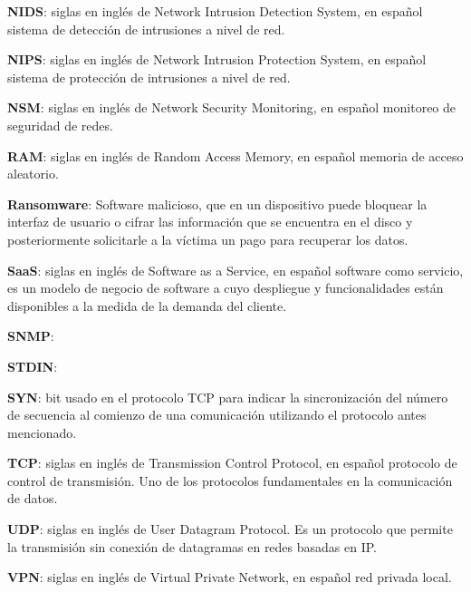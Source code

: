 \textbf{NIDS}: siglas en inglés de Network Intrusion Detection System, en español sistema de detección de intrusiones a nivel de red. \par

\textbf{NIPS}: siglas en inglés de Network Intrusion Protection System, en español sistema de protección de intrusiones a nivel de red. \par

\textbf{NSM}: siglas en inglés de Network Security Monitoring, en español monitoreo de seguridad de redes. \par

\textbf{RAM}: siglas en inglés de Random Access Memory, en español memoria de acceso aleatorio. \par

\textbf{Ransomware}: Software malicioso, que en un dispositivo puede bloquear la interfaz de usuario o cifrar las información que se encuentra en el disco y posteriormente solicitarle a la víctima un pago para recuperar los datos. \par
\textbf{SaaS}: siglas en inglés de Software as a Service, en español software como servicio, es un modelo de negocio de software a cuyo despliegue y funcionalidades están disponibles a la medida de la demanda del cliente. \par

\textbf{SNMP}:  \par

\textbf{STDIN}: \par

\textbf{SYN}: bit usado en el protocolo TCP para indicar la sincronización del número de secuencia al comienzo de una comunicación utilizando el protocolo antes mencionado. \par

\textbf{TCP}: siglas en inglés de Transmission Control Protocol, en español protocolo de control de transmisión. Uno de los protocolos fundamentales en la comunicación de datos. \par

\textbf{UDP}: siglas en inglés de User Datagram Protocol. Es un protocolo que permite la transmisión sin conexión de datagramas en redes basadas en IP. \par

\textbf{VPN}: siglas en inglés de Virtual Private Network, en español red privada local. \par
